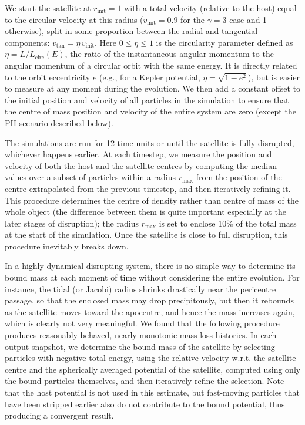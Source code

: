 \documentclass[twocolumn]{aastex63}
\newcommand{\PH}{\textsf{P\!H}\xspace}
\begin{document}
We start the satellite at $r_\mathrm{init}=1$ with a total velocity (relative to the host) equal to the circular velocity at this radius ($v_\mathrm{init}=0.9$ for the $\gamma=3$ case and 1 otherwise), split in some proportion between the radial and tangential components: $v_\mathrm{tan} = \eta\,v_\mathrm{init}$. Here $0 \le \eta \le 1$ is the circularity parameter defined as
$\eta=L/L_\mathrm{circ}(E)$, the ratio of the instantaneous angular momentum to the angular momentum of a circular orbit with the same energy. It is directly related to the orbit eccentricity $e$ (e.g., for a Kepler potential, $\eta = \sqrt{1-e^2}$), but is easier to measure at any moment during the evolution. We then add a constant offset to the initial position and velocity of all particles in the simulation to ensure that the centre of mass position and velocity of the entire system are zero (except the \PH scenario described below). %

The simulations are run for 12 time units or until the satellite is fully disrupted, whichever happens earlier. At each timestep, we measure the position and velocity of both the host and the satellite centres by computing the median values over a subset of particles within a radius $r_\mathrm{max}$ from the position of the centre extrapolated from the previous timestep, and then iteratively refining it. This procedure determines the centre of density rather than centre of mass of the whole object (the difference between them is quite important especially at the later stages of disruption); the radius $r_\mathrm{max}$ is set to enclose 10\% of the total mass at the start of the simulation. Once the satellite is close to full disruption, this procedure inevitably breaks down.

In a highly dynamical disrupting system, there is no simple way to determine its bound mass at each moment of time without considering the entire evolution. For instance, the tidal (or Jacobi) radius shrinks drastically near the pericentre passage, so that the enclosed mass may drop precipitously, but then it rebounds as the satellite moves toward the apocentre, and hence the mass increases again, which is clearly not very meaningful. We found that the following procedure produces reasonably behaved, nearly monotonic mass loss histories. In each output snapshot, we determine the bound mass of the satellite by selecting particles with negative total energy, using the relative velocity w.r.t. the satellite centre and the spherically averaged potential of the satellite, computed using only the bound particles themselves, and then iteratively refine the selection. Note that the host potential is not used in this estimate, but fast-moving particles that have been stripped earlier also do not contribute to the bound potential, thus producing a convergent result.
\end{document}
